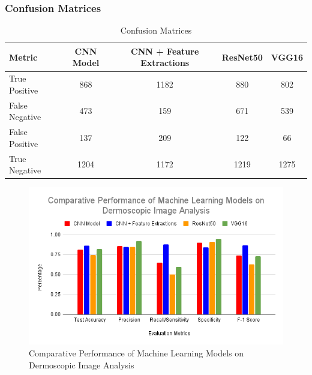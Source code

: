 \documentclass[10pt,twocolumn]{article}
\begin{document}
\subsubsection{Confusion Matrices}
\begin{table}[h]
\centering
\caption{Confusion Matrices}
\scriptsize
\setlength\tabcolsep{3pt} 
\begin{tabular}{|l|c|c|c|c|}
\hline
\textbf{Metric} & \textbf{CNN Model} & \textbf{CNN + Feature Extractions} & \textbf{ResNet50} & \textbf{VGG16} \\ \hline
True Positive & 868 & 1182 & 880 & 802 \\ \hline
False Negative & 473 & 159 & 671 & 539 \\ \hline
False Positive & 137 & 209 & 122 & 66 \\ \hline
True Negative & 1204 & 1172 & 1219 & 1275 \\ \hline
\end{tabular}
\end{table}

\begin{figure}[h]
\caption{Comparative Performance of Machine Learning Models on Dermoscopic Image Analysis}
\centering
\includegraphics[scale=0.4]{Comparative Performance of Machine Learning Models on Dermoscopic Image Analysis.png}\newline
\end{figure}
\end{document}
